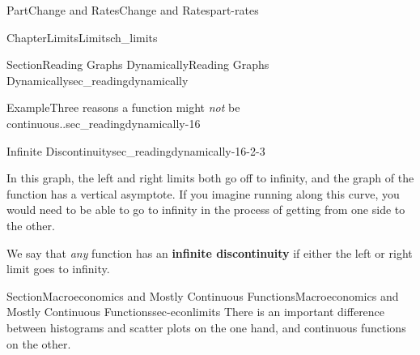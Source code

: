 \documentclass[oneside,10pt,]{tufte-book}
\newcommand{\terminology}[1]{\textbf{#1}}
\numberwithin{equation}{chapter}
\begin{document}
\begin{partptx}{Part}{Change and Rates}{}{Change and Rates}{}{}{part-rates}
\begin{chapterptx}{Chapter}{Limits}{}{Limits}{}{}{ch_limits}
\begin{sectionptx}{Section}{Reading Graphs Dynamically}{}{Reading Graphs Dynamically}{}{}{sec_readingdynamically}
\begin{example}{Example}{Three reasons  a function might \emph{not} be continuous..}{sec_readingdynamically-16}
\begin{descriptionlist}
\begin{dlimedium}{Infinite Discontinuity}{sec_readingdynamically-16-2-3}
\begin{image}{0.25}{0.5}{0.25}{}%
%
\end{image}%
 In this graph, the left and right limits both go off to infinity, and the graph of the function has a vertical asymptote. If you imagine running along this curve, you would need to be able to go to infinity in the process of getting from one side to the other.%
\par
We say that \emph{any} function has an \terminology{infinite discontinuity} if either the left or right limit goes to infinity.%
\end{dlimedium}%
\end{descriptionlist}
\end{example}
\end{sectionptx}
%
%
\typeout{************************************************}
\typeout{************************************************}
%
\begin{sectionptx}{Section}{Macroeconomics and Mostly Continuous Functions}{}{Macroeconomics and Mostly Continuous Functions}{}{}{sec-econlimits}
There is an important difference between histograms and scatter plots on the one hand, and continuous functions on the other. \begin{image}{0}{1}{0}{}%
\end{image}
\end{sectionptx}
\end{chapterptx}
\end{partptx}
\end{document}
